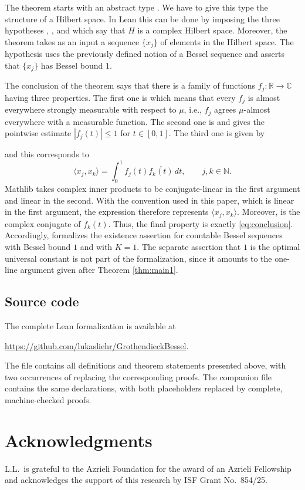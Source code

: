 \documentclass[reqno,a4paper,12pt]{amsart}
\numberwithin{equation}{section}
\newcommand\1{\mathds{1}}
\begin{document}
The theorem starts with an abstract type . We have to give this type the structure of a Hilbert space. In Lean this can be done by imposing the three hypotheses ,
, and  which say that $H$ is a complex Hilbert space. Moreover, the theorem takes as an input a sequence $\{x_j \}$ of elements in the Hilbert space. The hypothesis  uses the previously defined notion of a Bessel sequence and asserts that $\{x_j \}$ has Bessel bound $1$.

The conclusion of the theorem says that there is a family of functions $f_j:\mathbb{R}\to\mathbb{C}$ having three properties. The first one is  which means that every
$f_j$ is almost everywhere strongly measurable with respect to
$\mu$, i.e., $f_j$ agrees $\mu$-almost everywhere with a measurable function. The second one is  and gives the pointwise estimate
$
    |f_j(t)|\leq 1
$
for $t\in[0,1]$. The third one is given by
\begin{center}
\end{center}
and this corresponds to
\begin{equation}\label{eq:conclusion}
    \langle x_j,x_k\rangle
    =
    \int_0^1 f_j(t)\overline{f_k(t)}\,dt,
    \qquad j,k\in\mathbb{N}.
\end{equation}
Mathlib takes complex inner products to be conjugate-linear in the first argument and linear in the second. With the convention used in this paper, which is linear in the first argument, the expression  therefore represents $\langle x_j,x_k\rangle$. Moreover,  is the complex conjugate of $f_k(t)$. Thus, the final property is exactly \eqref{eq:conclusion}.
Accordingly,  formalizes the existence assertion for
countable Bessel sequences with Bessel bound $1$ and with
$K=1$. The separate assertion that $1$ is the optimal universal
constant is not part of the formalization, since it amounts to the one-line argument given after Theorem \ref{thm:main1}.

\subsection{Source code}

The complete Lean formalization is available at
\begin{center}   \url{https://github.com/lukasliehr/GrothendieckBessel}.
\end{center}
The file  contains all definitions and theorem
statements presented above, with two occurrences of 
replacing the corresponding proofs. The companion file
 contains the same declarations, with
both placeholders replaced by complete, machine-checked proofs.

\section*{Acknowledgments}

L.L.~is grateful to the Azrieli Foundation for the award of an Azrieli Fellowship and acknowledges the support of this research by ISF Grant No.~854/25.



\end{document}
